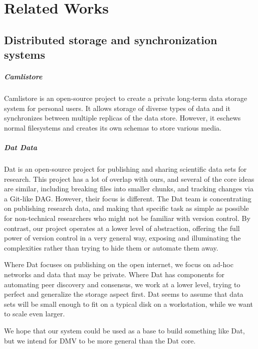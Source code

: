 \chapter{Related Works}

\section{Distributed storage and synchronization systems}

\paragraph{Camlistore}

Camlistore \cite{camlistore_homepage} is an open-source project to create a
private long-term data storage system for personal users. It allows storage of
diverse types of data and it synchronizes between multiple replicas of the data
store. However, it eschews normal filesystems and creates its own schemas to
store various media.


\paragraph{Dat Data}

Dat \cite{dat_homepage} is an open-source project for publishing and sharing
scientific data sets for research. This project has a lot of overlap with ours,
and several of the core ideas are similar, including breaking files into smaller
chunks, and tracking changes via a Git-like \gls{DAG}. However, their focus is
different. The Dat team is concentrating on publishing research data, and making
that specific task as simple as possible for non-technical researchers who might
not be familiar with version control. By contrast, our project operates at a
lower level of abstraction, offering the full power of version control in a very
general way, exposing and illuminating the complexities rather than trying to
hide them or automate them away.

Where Dat focuses on publishing on the open internet, we focus on ad-hoc
networks and data that may be private. Where Dat has components for automating
peer discovery and consensus, we work at a lower level, trying to perfect and
generalize the storage aspect first. Dat seems to assume that data sets will be
small enough to fit on a typical disk on a workstation, while we want to scale
even larger.

We hope that our system could be used as a base to build something like Dat, but
we intend for \gls{DMV} to be more general than the Dat core.


